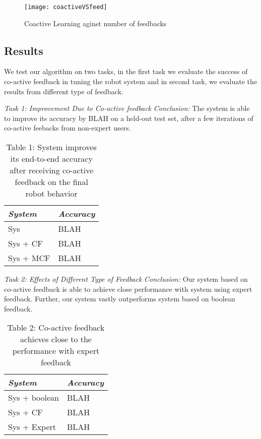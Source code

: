 		\begin{figure}[h]
		\texttt{[image: coactiveVSfeed]}
		\centering
		\caption{Coactive Learning aginst number of feedbacks}
  		\label{fig:c1}
		\end{figure}




\subsection{Results} 
We test our algorithm on two tasks, in the first task we evaluate the success of co-active feedback in tuning the robot system and in second task, we evaluate the results from different type of feedback.

\noindent\textit{Task 1: Improvement Due to Co-active feedback}
\textit{Conclusion:} The system is able to improve its accuracy by BLAH on a held-out test set, after a few iterations of co-active feebacks from non-expert users.

\begin{table}
\label{tbl:tsk1}
\caption{Table 1: System improves its end-to-end accuracy after receiving co-active feedback on the final robot behavior}
\centering
\begin{tabular}{|l|l|}
\hline
\textit{System} & \textit{Accuracy} \\
\hline
Sys & BLAH \\
Sys + CF & BLAH \\
Sys + MCF & BLAH \\
\hline
\end{tabular}
\end{table}

\noindent\textit{Task 2: Effects of Different Type of Feedback}
\textit{Conclusion:} Our system based on co-active feedback is able to achieve close performance with system using expert feedback. Further, our system vastly outperforms system based on boolean feedback.

\begin{table}
\label{tbl:tsk2}
\caption{Table 2: Co-active feedback achieves close to the performance with expert feedback}
\centering
\begin{tabular}{|l|l|}
\hline
\textit{System} & \textit{Accuracy} \\
\hline
Sys + boolean & BLAH\\
Sys + CF & BLAH \\
Sys + Expert & BLAH \\
\hline
\end{tabular}
\end{table}


